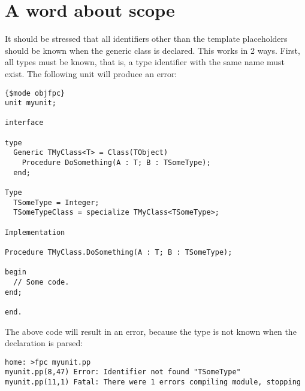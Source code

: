 \section{A word about scope}
It should be stressed that all identifiers other than the template placeholders
should be known when the generic class is declared. This works in 2 ways.
First, all types must be known, that is, a type identifier with the same name
must exist. The following unit will produce an error:
\begin{verbatim}
{$mode objfpc}
unit myunit;

interface

type 
  Generic TMyClass<T> = Class(TObject)
    Procedure DoSomething(A : T; B : TSomeType);
  end;

Type
  TSomeType = Integer;
  TSomeTypeClass = specialize TMyClass<TSomeType>;

Implementation

Procedure TMyClass.DoSomething(A : T; B : TSomeType);

begin
  // Some code.
end;

end.
\end{verbatim}
The above code will result in an error, because the type  is
not known when the declaration is parsed:
\begin{verbatim}
home: >fpc myunit.pp
myunit.pp(8,47) Error: Identifier not found "TSomeType"
myunit.pp(11,1) Fatal: There were 1 errors compiling module, stopping
\end{verbatim}

